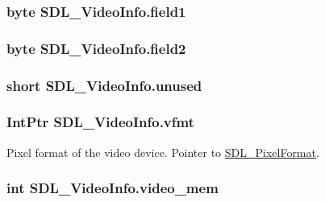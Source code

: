 \hypertarget{struct_s_d_l___video_info_ad74c1e538480d88be4654b1309150b2d}{
\subsubsection[{field1}]{\setlength{\rightskip}{0pt plus 5cm}byte {\bf SDL\_\-VideoInfo.field1}}}
\label{struct_s_d_l___video_info_ad74c1e538480d88be4654b1309150b2d}
\hypertarget{struct_s_d_l___video_info_adda8d23e9a7a285a775ea8e644ede26e}{
\subsubsection[{field2}]{\setlength{\rightskip}{0pt plus 5cm}byte {\bf SDL\_\-VideoInfo.field2}}}
\label{struct_s_d_l___video_info_adda8d23e9a7a285a775ea8e644ede26e}
\hypertarget{struct_s_d_l___video_info_a21045d5bb10f224a4e2f7d454f6401e8}{
\subsubsection[{unused}]{\setlength{\rightskip}{0pt plus 5cm}short {\bf SDL\_\-VideoInfo.unused}}}
\label{struct_s_d_l___video_info_a21045d5bb10f224a4e2f7d454f6401e8}
\hypertarget{struct_s_d_l___video_info_ac33337330f3d93eed72dd3ca72b11fd9}{
\subsubsection[{vfmt}]{\setlength{\rightskip}{0pt plus 5cm}IntPtr {\bf SDL\_\-VideoInfo.vfmt}}}
\label{struct_s_d_l___video_info_ac33337330f3d93eed72dd3ca72b11fd9}


Pixel format of the video device. Pointer to \hyperlink{struct_s_d_l___pixel_format}{SDL\_\-PixelFormat}. 

\hypertarget{struct_s_d_l___video_info_af97199a981aafa4f7083f3a3982f8f0b}{
\subsubsection[{video\_\-mem}]{\setlength{\rightskip}{0pt plus 5cm}int {\bf SDL\_\-VideoInfo.video\_\-mem}}}
\label{struct_s_d_l___video_info_af97199a981aafa4f7083f3a3982f8f0b}



